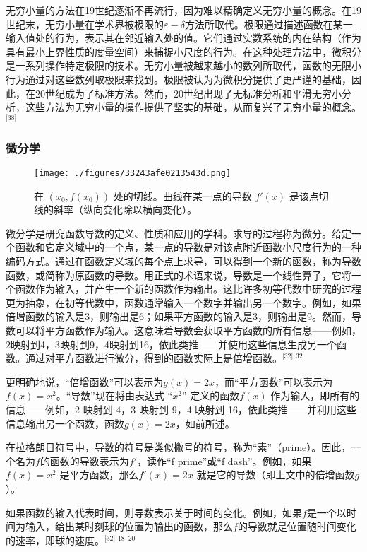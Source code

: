 无穷小量的方法在19世纪逐渐不再流行，因为难以精确定义无穷小量的概念。在19世纪末，无穷小量在学术界被极限的\(\varepsilon-\delta\)方法所取代。极限通过描述函数在某一输入值处的行为，表示其在邻近输入处的值。它们通过实数系统的内在结构（作为具有最小上界性质的度量空间）来捕捉小尺度的行为。在这种处理方法中，微积分是一系列操作特定极限的技术。无穷小量被越来越小的数列所取代，函数的无限小行为通过对这些数列取极限来找到。极限被认为为微积分提供了更严谨的基础，因此，在20世纪成为了标准方法。然而，20世纪出现了无标准分析和平滑无穷小分析，这些方法为无穷小量的操作提供了坚实的基础，从而复兴了无穷小量的概念。\(^\text{[38]}\)
\subsubsection{微分学}
\begin{figure}[ht]
\centering
\texttt{[image: ./figures/33243afe0213543d.png]}
\caption{在 \((x_0, f(x_0))\) 处的切线。曲线在某一点的导数 \(f'(x)\) 是该点切线的斜率（纵向变化除以横向变化）。} \label{fig_Calcul_7}
\end{figure}
微分学是研究函数导数的定义、性质和应用的学科。求导的过程称为微分。给定一个函数和它定义域中的一个点，某一点的导数是对该点附近函数小尺度行为的一种编码方式。通过在函数定义域的每个点上求导，可以得到一个新的函数，称为导数函数，或简称为原函数的导数。用正式的术语来说，导数是一个线性算子，它将一个函数作为输入，并产生一个新的函数作为输出。这比许多初等代数中研究的过程更为抽象，在初等代数中，函数通常输入一个数字并输出另一个数字。例如，如果倍增函数的输入是3，则输出是6；如果平方函数的输入是3，则输出是9。然而，导数可以将平方函数作为输入。这意味着导数会获取平方函数的所有信息——例如，2映射到4，3映射到9，4映射到16，依此类推——并使用这些信息生成另一个函数。通过对平方函数进行微分，得到的函数实际上是倍增函数。\(^\text{[32]: 32}\) 

更明确地说，“倍增函数”可以表示为\( g(x) = 2x \)，而“平方函数”可以表示为\( f(x) = x^2\)。“导数”现在将由表达式 “\(x^2\)” 定义的函数\( f(x) \) 作为输入，即所有的信息——例如，2 映射到 4，3 映射到 9，4 映射到 16，依此类推——并利用这些信息输出另一个函数，函数\( g(x) = 2x \)，如前所述。

在拉格朗日符号中，导数的符号是类似撇号的符号，称为“素”（prime）。因此，一个名为\( f \)的函数的导数表示为\( f' \)，读作“f prime”或“f dash”。例如，如果\( f(x) = x^2 \) 是平方函数，那么\( f'(x) = 2x \) 就是它的导数（即上文中的倍增函数\( g \)）。

如果函数的输入代表时间，则导数表示关于时间的变化。例如，如果\( f \)是一个以时间为输入，给出某时刻球的位置为输出的函数，那么\( f \)的导数就是位置随时间变化的速率，即球的速度。\(^\text{[32]: 18–20 }\) 